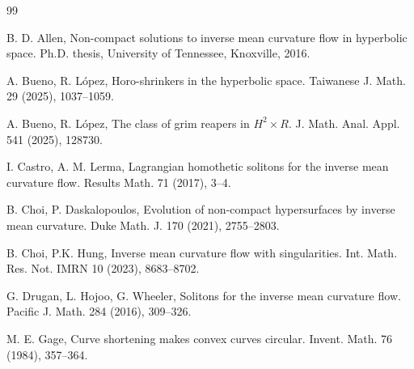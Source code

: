 \documentclass[12pt]{amsart}
\theoremstyle{plain}
\theoremstyle{definition}
\begin{document}
\begin{thebibliography}{99}
%




 B. D. Allen, Non-compact solutions to inverse mean curvature flow in hyperbolic space. Ph.D. thesis, University of Tennessee, Knoxville, 2016.

 A. Bueno, R. L\'opez, Horo-shrinkers in the hyperbolic space. Taiwanese J. Math. 29 (2025), 1037--1059.

 A. Bueno, R. L\'opez, The class of grim reapers in $H^2\times R$. J. Math. Anal. Appl. 541 (2025), 128730.

 I. Castro, A. M. Lerma,  Lagrangian homothetic solitons for the inverse mean curvature flow. Results Math. 71 (2017), 3--4.

 B. Choi, P. Daskalopoulos, Evolution of non-compact hypersurfaces by inverse mean curvature. Duke Math. J. 170 (2021), 2755--2803.

 B. Choi, P.K. Hung, Inverse mean curvature flow with singularities. Int. Math. Res. Not. IMRN 10 (2023), 8683--8702. 




 G. Drugan, L. Hojoo, G. Wheeler, Solitons for the inverse mean curvature flow. Pacific J. Math.  284 (2016), 309--326.






 M. E. Gage, Curve shortening makes convex curves circular. Invent. Math.  76 (1984), 357--364.


\end{thebibliography}
\end{document}
